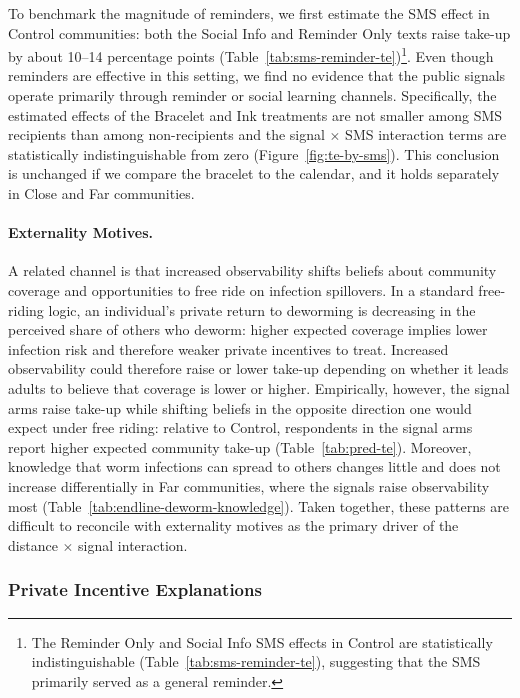 \documentclass[12pt,a4paper]{article}
\begin{document}
To benchmark the magnitude of reminders, we first estimate the SMS effect in Control communities: both the Social Info and Reminder Only texts raise take-up by about 10--14 percentage points (Table~\ref{tab:sms-reminder-te})\footnote{The Reminder Only and Social Info SMS effects in Control are statistically indistinguishable (Table~\ref{tab:sms-reminder-te}), suggesting that the SMS primarily served as a general reminder.}. Even though reminders are effective in this setting, we find no evidence that the public signals operate primarily through reminder or social learning channels. Specifically, the estimated effects of the Bracelet and Ink treatments are not smaller among SMS recipients than among non-recipients and the signal $\times$ SMS interaction terms are statistically indistinguishable from zero (Figure~\ref{fig:te-by-sms}). This conclusion is unchanged if we compare the bracelet to the calendar, and it holds separately in Close and Far communities.

\paragraph{Externality Motives.} A related channel is that increased observability shifts beliefs about community coverage and opportunities to free ride on infection spillovers. In a standard free-riding logic, an individual’s private return to deworming is decreasing in the perceived share of others who deworm: higher expected coverage implies lower infection risk and therefore weaker private incentives to treat. Increased observability could therefore raise or lower take-up depending on whether it leads adults to believe that coverage is lower or higher. Empirically, however, the signal arms raise take-up while shifting beliefs in the opposite direction one would expect under free riding: relative to Control, respondents in the signal arms report higher expected community take-up (Table~\ref{tab:pred-te}). Moreover, knowledge that worm infections can spread to others changes little and does not increase differentially in Far communities, where the signals raise observability most (Table~\ref{tab:endline-deworm-knowledge}). Taken together, these patterns are difficult to reconcile with externality motives as the primary driver of the distance $\times$ signal interaction.


\subsubsection{Private Incentive Explanations}\label{subsec:consumption}
\end{document}
